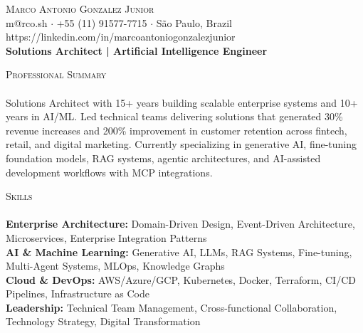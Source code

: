 \documentclass[a4paper]{article}
\newcommand{\lineunder} {
    \vspace*{-8pt} \\
    \hspace*{-18pt} \hrulefill \\
}
\newcommand{\header} [1] {
    {\hspace*{-18pt}\vspace*{6pt} \textsc{#1}}
    \vspace*{-6pt} \lineunder
}
\begin{document}
\newlength{\sectionindent}
\setlength{\sectionindent}{-0.4in} %

\renewcommand{\header}[1] {
    {\hspace*{-18pt}\vspace*{6pt} \textsc{#1}}
    \vspace*{-6pt} \lineunder
}
\vspace*{-40pt}

\vspace*{-10pt}
\begin{center}
    {\Huge \scshape {Marco Antonio Gonzalez Junior}}                \\
    \vspace{2.5pt}
    m@rco.sh $\cdot$ +55 (11) 91577-7715 $\cdot$ São Paulo, Brazil  \\
    \vspace{2.5pt}
    https://linkedin.com/in/marcoantoniogonzalezjunior              \\
    \vspace{1.25mm}
    \textbf{Solutions Architect | Artificial Intelligence Engineer}
\end{center}
\vspace{-1.5mm}
\header{Professional Summary}
Solutions Architect with 15+ years building scalable enterprise systems and 10+ years in AI/ML. Led technical teams delivering solutions that generated 30\% revenue increases and 200\% improvement in customer retention across fintech, retail, and digital marketing. Currently specializing in generative AI, fine-tuning foundation models, RAG systems, agentic architectures, and AI-assisted development workflows with MCP integrations.
\vspace{1.5mm}

\header{Skills}
\vspace{0.5mm}
\textbf{Enterprise Architecture:} Domain-Driven Design, Event-Driven Architecture, Microservices, Enterprise Integration Patterns \\
\textbf{AI \& Machine Learning:} Generative AI, LLMs, RAG Systems, Fine-tuning, Multi-Agent Systems, MLOps, Knowledge Graphs \\
\textbf{Cloud \& DevOps:} AWS/Azure/GCP, Kubernetes, Docker, Terraform, CI/CD Pipelines, Infrastructure as Code \\
\textbf{Leadership:} Technical Team Management, Cross-functional Collaboration, Technology Strategy, Digital Transformation \\
\vspace{1.5mm}
\end{document}
